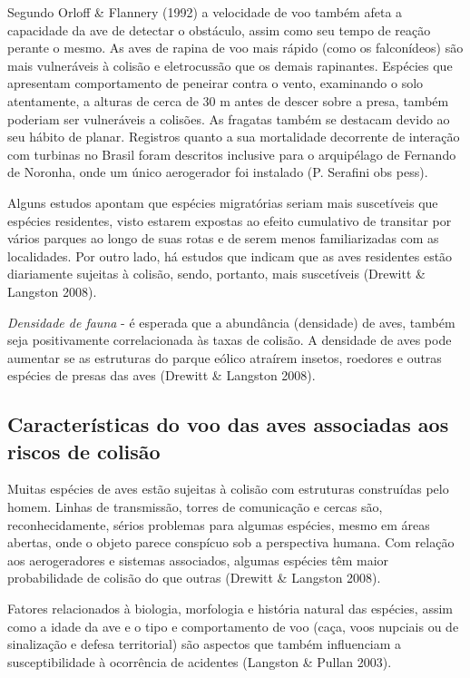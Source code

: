\documentclass[
]{scrbook}
\begin{document}
Segundo Orloff \& Flannery (1992) a velocidade de voo também afeta a capacidade da ave de detectar o obstáculo, assim como seu tempo de reação perante o mesmo. As aves de rapina de voo mais rápido (como os falconídeos) são mais vulneráveis à colisão e eletrocussão que os demais rapinantes. Espécies que apresentam comportamento de peneirar contra o vento, examinando o solo atentamente, a alturas de cerca de 30 m antes de descer sobre a presa, também poderiam ser vulneráveis a colisões. As fragatas também se destacam devido ao seu hábito de planar. Registros quanto a sua mortalidade decorrente de interação com turbinas no Brasil foram descritos inclusive para o arquipélago de Fernando de Noronha, onde um único aerogerador foi instalado (P. Serafini obs pess).

Alguns estudos apontam que espécies migratórias seriam mais suscetíveis que espécies residentes, visto estarem expostas ao efeito cumulativo de transitar por vários parques ao longo de suas rotas e de serem menos familiarizadas com as localidades. Por outro lado, há estudos que indicam que as aves residentes estão diariamente sujeitas à colisão, sendo, portanto, mais suscetíveis (Drewitt \& Langston 2008).

\emph{Densidade de fauna} - é esperada que a abundância (densidade) de aves, também seja positivamente correlacionada às taxas de colisão. A densidade de aves pode aumentar se as estruturas do parque eólico atraírem insetos, roedores e outras espécies de presas das aves (Drewitt \& Langston 2008).

\hypertarget{caracteristicas-voo}{%
\subsection{Características do voo das aves associadas aos riscos de colisão}\label{caracteristicas-voo}}

Muitas espécies de aves estão sujeitas à colisão com estruturas construídas pelo homem. Linhas de transmissão, torres de comunicação e cercas são, reconhecidamente, sérios problemas para algumas espécies, mesmo em áreas abertas, onde o objeto parece conspícuo sob a perspectiva humana. Com relação aos aerogeradores e sistemas associados, algumas espécies têm maior probabilidade de colisão do que outras (Drewitt \& Langston 2008).

Fatores relacionados à biologia, morfologia e história natural das espécies, assim como a idade da ave e o tipo e comportamento de voo (caça, voos nupciais ou de sinalização e defesa territorial) são aspectos que também influenciam a susceptibilidade à ocorrência de acidentes (Langston \& Pullan 2003).
\end{document}
